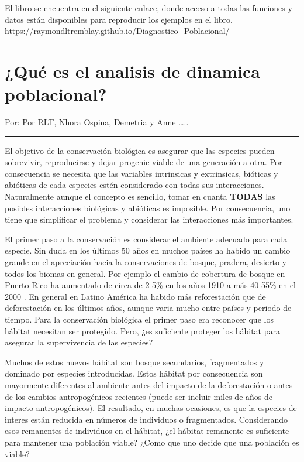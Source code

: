 \documentclass[
]{book}
\theoremstyle{definition}
\theoremstyle{definition}
\theoremstyle{definition}
\theoremstyle{definition}
\theoremstyle{remark}
\begin{document}
El libro se encuentra en el siguiente enlace, donde acceso a todas las funciones y datos están disponibles para reproducir los ejemplos en el libro. \url{https://raymondltremblay.github.io/Diagnostico_Poblacional/}

\chapter{¿Qué es el analisis de dinamica poblacional?}\label{quuxe9-es-el-analisis-de-dinamica-poblacional}

Por: Por RLT, Nhora Ospina, Demetria y Anne \ldots..

\begin{center}\rule{0.5\linewidth}{0.5pt}\end{center}

El objetivo de la conservación biológica es asegurar que las especies pueden sobrevivir, reproducirse y dejar progenie viable de una generación a otra. Por consecuencia se necesita que las variables intrinsicas y extrinsicas, bióticas y abióticas de cada especies estén considerado con todas sus interacciones. Naturalmente aunque el concepto es sencillo, tomar en cuanta \textbf{TODAS} las posibles interacciones biológicas y abióticas es imposible. Por consecuencia, uno tiene que simplificar el problema y considerar las interacciones más importantes.

El primer paso a la conservación es considerar el ambiente adecuado para cada especie. Sin duda en los últimos 50 años en muchos países ha habido un cambio grande en el apreciación hacia la conservaciones de bosque, pradera, desierto y todos los biomas en general. Por ejemplo el cambio de cobertura de bosque en Puerto Rico ha aumentado de circa de 2-5\% en los años 1910 a más 40-55\% en el 2000 \citep{pares2008agricultural, gould2017land}. En general en Latino América ha habido más reforestación que de deforestación \citep{aide2013deforestation} en los últimos años, aunque varia mucho entre países y periodo de tiempo. Para la conservación biológica el primer paso era reconocer que los hábitat necesitan ser protegido. Pero, ¿es suficiente proteger los hábitat para asegurar la supervivencia de las especies?

Muchos de estos nuevos hábitat son bosque secundarios, fragmentados y dominado por especies introducidas. Estos hábitat por consecuencia son mayormente diferentes al ambiente antes del impacto de la deforestación o antes de los cambios antropogénicos recientes (puede ser incluir miles de años de impacto antropogénicos). El resultado, en muchas ocasiones, es que la especies de interes están reducida en números de individuos o fragmentados. Considerando esos remanentes de individuos en el hábitat, ¿el hábitat remanente es suficiente para mantener una población viable? ¿Como que uno decide que una población es viable?
\end{document}
